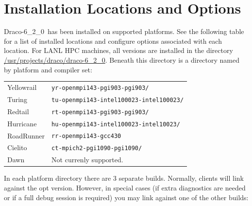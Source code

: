 \documentclass[note]{ResearchNote_pdf}
\newcommand{\draco}{Draco}
\newcommand{\dracor}{\draco-6\_2\_0}
\begin{document}

\section{Installation Locations and Options}

\dracor\ has been installed on supported platforms.  See the following
table for a list of installed locations and configure options
associated with each location.  For LANL HPC machines, all versions
are installed in the directory \url{/usr/projects/draco/draco-6_2_0}.
Beneath this directory is a directory named by platform and compiler
set: 
%
\begin{center}
  \footnotesize
  \begin{tabular}{lp{2.5in}}
    \hline\hline
    \textsf{Yellowrail} & \texttt{yr-openmpi143-pgi903-pgi903/}  \\
    \textsf{Turing}     & \texttt{tu-openmpi143-intel100023-intel100023/}  \\
    \textsf{Redtail}    & \texttt{rt-openmpi143-pgi903-pgi903/}  \\
    \textsf{Hurricane}  & \texttt{hu-openmpi143-intel100023-intel10023/}  \\
    \textsf{RoadRunner} & \texttt{rr-openmpi143-gcc430}  \\
    \textsf{Cielito}    & \texttt{ct-mpich2-pgi1090-pgi1090/}  \\
    \textsf{Dawn}       & Not currenly supported. \\
    \hline\hline
  \end{tabular}
\end{center}
%
In each platform directory there are 3 separate builds.  Normally,
clients will link against the \textsf{opt} version.  However, in
special cases (if extra diagnostics are needed or if a full debug
session is required) you may link against one of the other builds:
%
\end{document}
